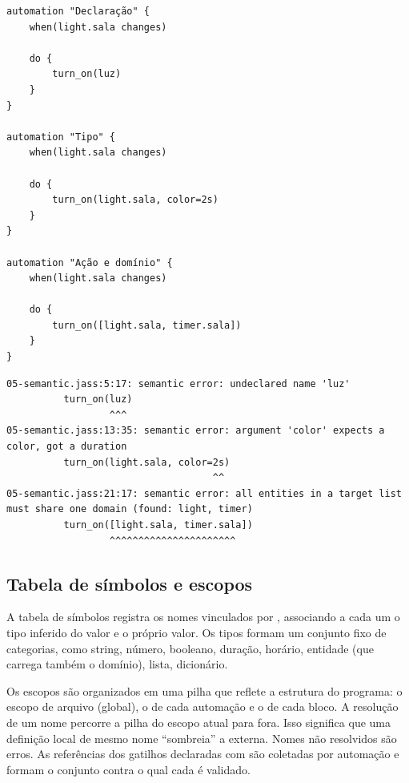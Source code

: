 \documentclass[12pt]{article}
\renewcommand\texttt[1]{\svtt{\small#1}}
\begin{document}
\begin{listing}[H]
    \centering
    \begin{verbatim}
automation "Declaração" {
    when(light.sala changes)

    do {
        turn_on(luz)
    }
}

automation "Tipo" {
    when(light.sala changes)

    do {
        turn_on(light.sala, color=2s)
    }
}

automation "Ação e domínio" {
    when(light.sala changes)

    do {
        turn_on([light.sala, timer.sala])
    }
}         
    \end{verbatim}
    \begin{verbatim}
05-semantic.jass:5:17: semantic error: undeclared name 'luz'
          turn_on(luz)
                  ^^^
05-semantic.jass:13:35: semantic error: argument 'color' expects a color, got a duration
          turn_on(light.sala, color=2s)
                                    ^^
05-semantic.jass:21:17: semantic error: all entities in a target list must share one domain (found: light, timer)
          turn_on([light.sala, timer.sala])
                  ^^^^^^^^^^^^^^^^^^^^^^
    \end{verbatim}
    \caption{Demonstração de erros semânticos.}
    \label{lst:semantic_errors}
\end{listing}


\subsection{Tabela de símbolos e escopos}

A tabela de símbolos registra os nomes vinculados por
\texttt{def}, associando a cada um o tipo inferido do valor e
o próprio valor. Os
tipos formam um conjunto fixo de categorias, como string, número,
booleano, duração, horário, entidade (que carrega também o domínio), lista, dicionário.

Os escopos são organizados em uma pilha que reflete a
estrutura do programa: o escopo de arquivo (global), o de cada
automação e o de cada bloco. A resolução de
um nome percorre a pilha do escopo atual para fora. Isso significa que uma definição local
de mesmo nome ``sombreia'' a externa. Nomes não resolvidos são erros. As referências dos
gatilhos declaradas com \texttt{as\ "id"} são coletadas por automação e
formam o conjunto contra o qual cada \texttt{triggeredby\ "id"} é
validado.
\end{document}
